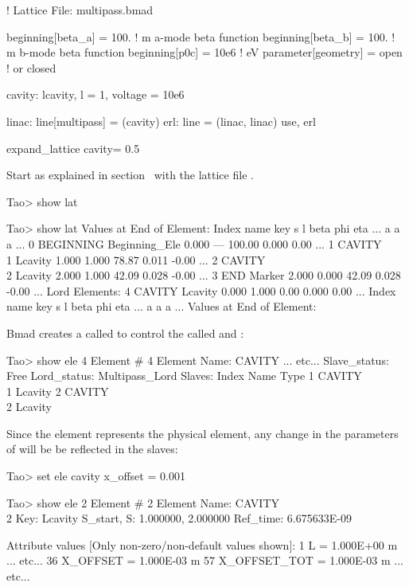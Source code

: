 \documentclass{hitec}
\begin{document}
\begin{code}
! Lattice File: multipass.bmad

beginning[beta_a] = 100.   ! m  a-mode beta function
beginning[beta_b] = 100.   ! m  b-mode beta function
beginning[p0c] = 10e6   ! eV   
parameter[geometry] = open      ! or closed

cavity: lcavity, l = 1, voltage = 10e6

linac: line[multipass] = (cavity)
erl: line = (linac, linac) 
use, erl

expand_lattice                
cavity = 0.5
\end{code}

Start \tao as explained in section~ with the lattice file
.

\begin{code}
Tao> show lat

Tao> show lat
      Values at End of Element:
 Index  name      key                    s       l    beta     phi    eta ...
                                                         a       a      a ...
     0  BEGINNING Beginning_Ele      0.000     ---  100.00   0.000   0.00 ...
     1  CAVITY\\1  Lcavity           1.000   1.000   78.87   0.011  -0.00 ...
     2  CAVITY\\2  Lcavity           2.000   1.000   42.09   0.028  -0.00 ...
     3  END       Marker             2.000   0.000   42.09   0.028  -0.00 ...
Lord Elements:
     4  CAVITY    Lcavity            0.000   1.000    0.00   0.000   0.00 ...
 Index  name      key                    s       l    beta     phi    eta ...
                                                         a       a      a ...
  Values at End of Element:
\end{code}

Bmad creates a  called  to control the  called
 and :
\begin{code}
Tao> show ele 4
 Element #                4
 Element Name: CAVITY
... etc...
Slave_status: Free
Lord_status:  Multipass_Lord
Slaves:
   Index   Name        Type
       1   CAVITY\\1    Lcavity
       2   CAVITY\\2    Lcavity
\end{code}

Since the  element represents the physical element, any change in the parameters of 
will be be reflected in the slaves:
\begin{code}
Tao> set ele cavity x_offset = 0.001

Tao> show ele 2
 Element #                2
 Element Name: CAVITY\\2
 Key: Lcavity
 S_start, S:    1.000000,    2.000000
 Ref_time:  6.675633E-09

 Attribute values [Only non-zero/non-default values shown]:
    1   L          =  1.000E+00 m
... etc...
   36   X_OFFSET   =  1.000E-03 m        57   X_OFFSET_TOT  =  1.000E-03 m
... etc...
\end{code}
\end{document}
